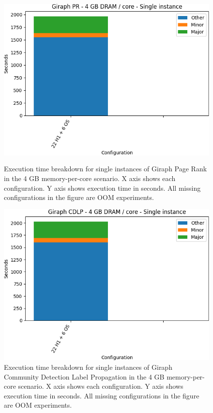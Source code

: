 \begin{figure}[thbp]
        \centering
    \includegraphics[width=\linewidth]{./fig/g_pr64_single.png}
    \caption{Execution time breakdown for single instances of Giraph
    Page Rank in the 4 GB memory-per-core scenario. X axis shows each configuration.
        Y axis shows execution time in seconds. All missing configurations in the figure are OOM experiments.}
    \label{fig:g_pr64_single}
    \includegraphics[width=\linewidth]{./fig/g_cdlp64_single.png}
    \caption{Execution time breakdown for single instances of Giraph
    Community Detection Label Propagation in the 4 GB memory-per-core scenario. X axis shows each configuration. 
        Y axis shows execution time in seconds. All missing configurations in the figure are OOM experiments.}
    \label{fig:g_cdlp64_single}
\end{figure}

